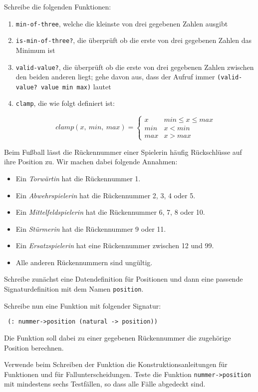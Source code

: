 \begin{aufgabe}
  Schreibe die folgenden Funktionen:
  \begin{enumerate}
  \item \lstinline{min-of-three}, welche die kleinste von drei
    gegebenen Zahlen ausgibt
  \item \lstinline{is-min-of-three?}, die überprüft ob die erste
    von drei gegebenen Zahlen das Minimum ist
  \item \lstinline{valid-value?}, die überprüft ob die erste von
    drei gegebenen Zahlen zwischen den beiden anderen liegt; gehe
    davon aus, dass der Aufruf immer \lstinline{(valid-value? value min max)}
    lautet 
  \item \lstinline{clamp}, die wie folgt definiert ist:
    
    \[\mathit{clamp}(x,\ \mathit{min},\ \mathit{max})=
    \begin{cases} 
      x & \mathit{min} \leq x \leq \mathit{max}\\ 
      \mathit{min} & x < \mathit{min} \\ 
      \mathit{max} & x > \mathit{max}
    \end{cases}
    \]
    
  \end{enumerate}
\end{aufgabe}

\begin{aufgabe}
  Beim Fußball lässt die Rückennummer einer Spielerin
  häufig Rückschlüsse auf ihre Position zu. Wir machen dabei folgende
  Annahmen:
  \begin{itemize}
  \item Ein \emph{Torwärtin} hat die Rückennummer 1.
  \item Ein \emph{Abwehrspielerin} hat die Rückennummer 2, 3, 4 oder 5.
  \item Ein \emph{Mittelfeldspielerin} hat die Rückennummer 6, 7, 8 oder 10.
  \item Ein \emph{Stürmerin} hat die Rückennummer 9 oder 11.
  \item Ein \emph{Ersatzspielerin} hat eine Rückennummer zwischen 12 und 99.
  \item Alle anderen Rückennummern sind ungültig.
  \end{itemize}
  Schreibe zunächst eine Datendefinition für Positionen und dann eine
  passende Signaturdefinition mit dem Namen \lstinline{position}.
  
  Schreibe nun eine Funktion mit folgender Signatur:
\begin{lstlisting}
 (: nummer->position (natural -> position))
\end{lstlisting}
  Die Funktion soll dabei zu einer gegebenen Rückennummer die
  zugehörige Position berechnen.

  Verwende beim Schreiben der Funktion die
  Konstruktionsanleitungen für Funktionen und für
  Fallunterscheidungen.  Teste die Funktion
  \lstinline{nummer->position} mit mindestens sechs Testfällen, so dass
  alle Fälle abgedeckt sind.
\end{aufgabe}


